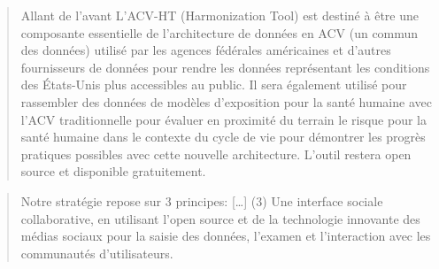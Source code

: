 
\blockcquote[traduction]{ingwersen_new_2015}{
Allant de l'avant L'ACV-HT (Harmonization Tool) est destiné à être une composante essentielle de l'architecture de données en ACV (un commun des données) utilisé par les agences fédérales américaines et d'autres fournisseurs de données pour rendre les données représentant les conditions des États-Unis plus accessibles au public.
Il sera également utilisé pour rassembler des données de modèles d'exposition pour la santé humaine avec l'ACV traditionnelle pour évaluer en proximité du terrain le risque pour la santé humaine dans le contexte du cycle de vie pour démontrer les progrès pratiques possibles avec cette nouvelle architecture. L'outil restera open source et disponible gratuitement.
}

\blockcquote[traduction]{weidema_bonsai_2014}{
Notre stratégie repose sur 3 principes: [\dots]
(3) Une interface sociale collaborative, en utilisant l'open source et de la technologie innovante des médias sociaux
pour la saisie des données, l'examen et l'interaction avec les communautés d'utilisateurs.
}


